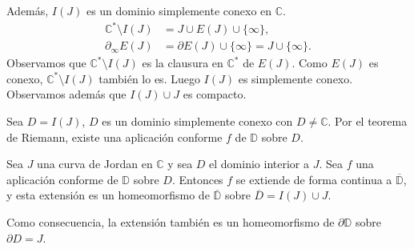 Además, $I(J)$ es un dominio simplemente conexo en $\mathbb{C}$.
\begin{align*}
    \mathbb{C}^\ast \setminus I(J) & = J \cup E(J) \cup  \{\infty\},                      \\
    \partial_\infty E(J)           & = \partial E(J) \cup \{\infty\} = J \cup \{\infty\}.
\end{align*}
Observamos que $\mathbb{C}^\ast \setminus I(J)$ es la clausura en $\mathbb{C}^\ast$ de $E(J)$.
Como $E(J)$ es conexo, $\mathbb{C}^\ast \setminus I(J)$ también lo es.
Luego $I(J)$ es simplemente conexo.
Observamos además que $I(J) \cup J$ es compacto.

Sea $D = I(J)$, $D$ es un dominio simplemente conexo con $D \neq \mathbb{C}$.
Por el teorema de Riemann, existe una aplicación conforme $f$ de $\mathbb{D}$ sobre $D$.

\begin{theorem}
    Sea $J$ una curva de Jordan en $\mathbb{C}$ y sea $D$ el dominio interior a $J$.
    Sea $f$ una aplicación conforme de $\mathbb{D}$ sobre $D$.
    Entonces $f$ se extiende de forma continua a $\overline{\mathbb{D}}$, y esta extensión es un homeomorfismo de $\overline{\mathbb{D}}$ sobre $\overline{D} = I(J) \cup J$.
\end{theorem}

\begin{remark}
    Como consecuencia, la extensión también es un homeomorfismo de $\partial\mathbb{D}$ sobre $\partial D = J$.
\end{remark}